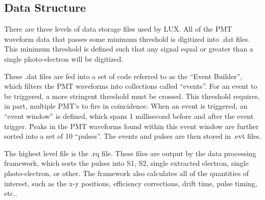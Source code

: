 \subsection{Data Structure}
There are three levels of data storage files used by LUX. All of the PMT waveform data that passes some minimum threshold is digitized into .dat files. This minimum threshold is defined such that any signal equal or greater than a single photo-electron will be digitized. 

These .dat files are fed into a set of code referred to as the ``Event Builder'', which filters the PMT waveforms into collections called ``events''. For an event to be triggered, a more stringent threshold must be crossed. This threshold requires, in part, multiple PMT's to fire in coincidence. When an event is triggered, an ``event window'' is defined, which spans 1 millisecond  before and after the event trigger. Peaks in the PMT waveforms found within this event window are further sorted into a set of 10 ``pulses''. The events and pulses are then stored in .evt files.

The highest level file is the .rq file. These files are output by the data processing framework, which sorts the pulses into S1, S2, single extracted electron, single photo-electron, or other. The framework also calculates all of the quantities of interest, such as the x-y positions, efficiency corrections, drift time, pulse timing, etc..


